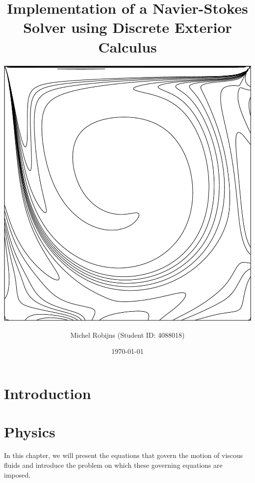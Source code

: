 \documentclass[a4paper, 11pt, toc=bibliography, parskip=half]{scrreprt}
\begin{document}
\titlehead{Delft University of Technology}
\subject{AE4134 - Computational Fluid Dynamics I}
\title{Implementation of a Navier-Stokes Solver using Discrete Exterior Calculus}
\subtitle{\vspace{1.5cm}\centering\includegraphics[width=0.9\linewidth]{Images/vorticity.pdf}\vspace{1cm}}
\author{Michel Robijns (Student ID: 4088018)}
\date{\today}

\maketitle

\tableofcontents

\chapter{Introduction}



\chapter{Physics}
\label{cha:physics}

In this chapter, we will present the equations that govern the motion of viscous fluids and introduce the problem on which these governing equations are imposed.
\end{document}
